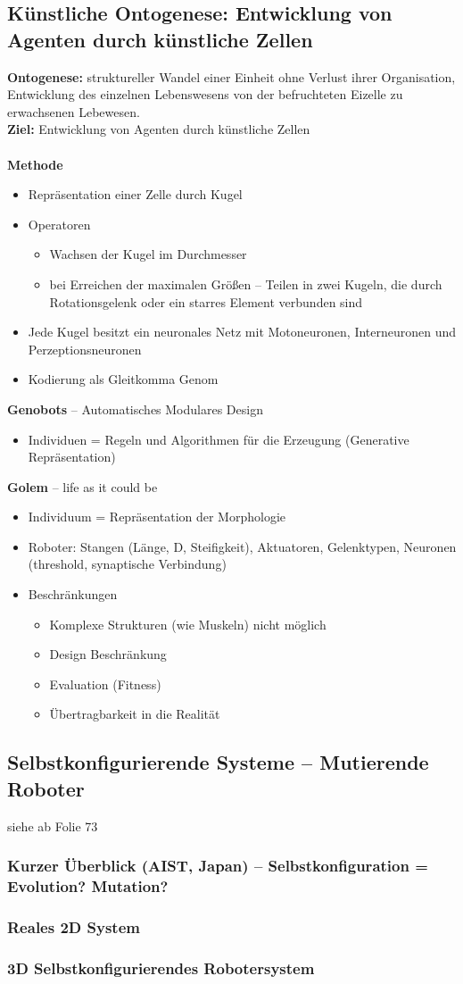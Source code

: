 \subsection{Künstliche Ontogenese: Entwicklung von Agenten durch künstliche Zellen}
\textbf{Ontogenese:}
struktureller Wandel einer Einheit ohne Verlust ihrer Organisation, Entwicklung des einzelnen Lebenswesens von der befruchteten Eizelle zu erwachsenen Lebewesen.\\
\textbf{Ziel:}
Entwicklung von Agenten durch künstliche Zellen\\\\
%
\textbf{Methode}
\begin{itemize}
	\item Repräsentation einer Zelle durch Kugel
	\item Operatoren 
	\begin{itemize}
		\item Wachsen der Kugel im Durchmesser
		\item bei Erreichen der maximalen Größen -- Teilen in zwei Kugeln, die durch Rotationsgelenk oder ein starres Element verbunden sind
	\end{itemize}
	\item Jede Kugel besitzt ein neuronales Netz mit Motoneuronen, Interneuronen und Perzeptionsneuronen
	\item Kodierung als Gleitkomma Genom
\end{itemize}
%
\textbf{Genobots} -- Automatisches Modulares Design
\begin{itemize}
	\item Individuen = Regeln und Algorithmen für die Erzeugung (Generative Repräsentation)
\end{itemize}
%
\textbf{Golem} -- life as it could be
\begin{itemize}
	\item Individuum = Repräsentation der Morphologie
	\item Roboter: Stangen (Länge, D, Steifigkeit), Aktuatoren, Gelenktypen, Neuronen (threshold, synaptische Verbindung)
	\item Beschränkungen 
	\begin{itemize}
		\item Komplexe Strukturen (wie Muskeln) nicht möglich
		\item Design Beschränkung
		\item Evaluation (Fitness)
		\item Übertragbarkeit in die Realität
	\end{itemize}
\end{itemize}

\subsection{Selbstkonfigurierende Systeme -- Mutierende Roboter}
siehe ab Folie 73
\subsubsection{Kurzer Überblick (AIST, Japan) -- Selbstkonfiguration = Evolution? Mutation?}
\subsubsection{Reales 2D System}
\subsubsection{3D Selbstkonfigurierendes Robotersystem}

